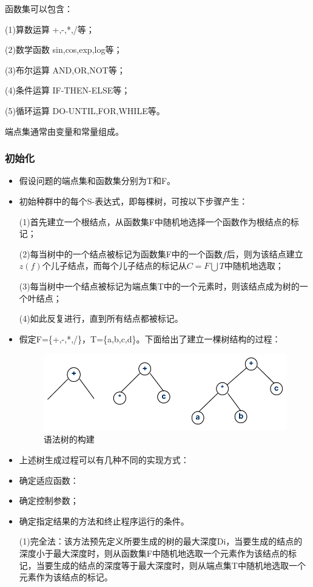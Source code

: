 \documentclass[UTF8]{ctexart}
\begin{document}
	函数集可以包含：
	
	(1)算数运算 +,-,*,/等；
	
	(2)数学函数 sin,cos,exp,log等；
	
	(3)布尔运算 AND,OR,NOT等；
	
	(4)条件运算 IF-THEN-ELSE等；
	
	(5)循环运算 DO-UNTIL,FOR,WHILE等。
	
	端点集通常由变量和常量组成。
	
\subsubsection{初始化}
	\begin{itemize}		
		\item 假设问题的端点集和函数集分别为T和F。
		\item 初始种群中的每个S-表达式，即每棵树，可按以下步骤产生：
		
		(1)首先建立一个根结点，从函数集F中随机地选择一个函数作为根结点的标记；
		
		(2)每当树中的一个结点被标记为函数集F中的一个函数$f$后，则为该结点建立$z(f)$个儿子结点，而每个儿子结点的标记从$C=F \bigcup T$中随机地选取；
		
		(3)每当树中一个结点被标记为端点集T中的一个元素时，则该结点成为树的一个叶结点；
		
		(4)如此反复进行，直到所有结点都被标记。
		\item 假定F=\{+,-,*,/\}，T=\{a,b,c,d\}。下面给出了建立一棵树结构的过程：
			\begin{figure}[ht]
				\centering	
				\includegraphics[scale=0.3]{images/build_tree.png}
				\caption{语法树的构建}
				\label{fig:label}
			\end{figure}
		\item 上述树生成过程可以有几种不同的实现方式：
		\item 确定适应函数：	
		\item 确定控制参数；
		\item 确定指定结果的方法和终止程序运行的条件。
		
		(1)完全法：该方法预先定义所要生成的树的最大深度Di，当要生成的结点的深度小于最大深度时，则从函数集F中随机地选取一个元素作为该结点的标记，当要生成的结点的深度等于最大深度时，则从端点集T中随机地选取一个元素作为该结点的标记。
		

\end{itemize}
\end{document}
